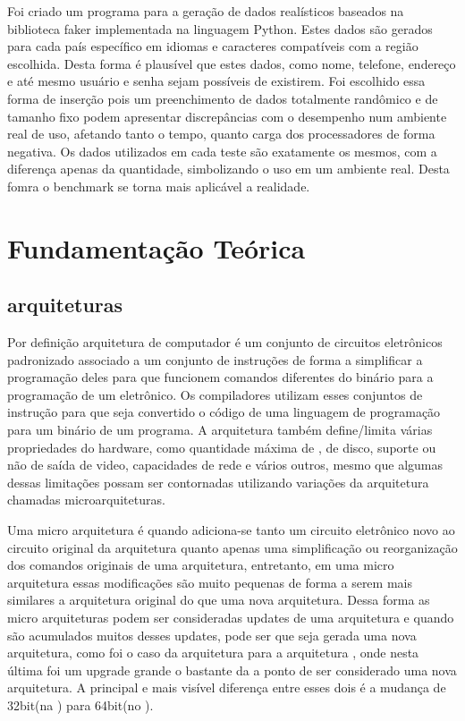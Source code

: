 \documentclass[
	12pt,				%
	openright,			%
	oneside,			%
	a4paper,			%
	english,			%
	french,				%
	spanish,			%
	brazil,				%
	]{abntex2}
\begin{document}
Foi criado um programa para a geração de dados realísticos baseados na biblioteca faker implementada na linguagem Python. Estes dados são gerados para cada país específico em idiomas e caracteres compatíveis com a região escolhida. Desta forma é plausível que estes dados, como nome, telefone, endereço e até mesmo usuário e senha sejam possíveis de existirem. Foi escolhido essa forma de inserção pois um preenchimento de dados totalmente randômico e de tamanho fixo podem apresentar discrepâncias com o desempenho num ambiente real de uso, afetando tanto o tempo, quanto carga dos processadores de forma negativa. Os dados utilizados em cada teste são exatamente os mesmos, com a diferença apenas da quantidade, simbolizando o uso em um ambiente real. Desta fomra o benchmark se torna mais aplicável a realidade.\newline

\chapter{Fundamentação Teórica}
\label{ch:fundamentacao teorica}

\section{arquiteturas}
\label{sec: arquiteturas}
Por definição arquitetura de computador é um conjunto de circuitos eletrônicos padronizado associado a um conjunto de instruções de forma a simplificar a programação deles para que funcionem comandos diferentes do binário para a programação de um eletrônico. Os compiladores utilizam esses conjuntos de instrução para que seja convertido o código de uma linguagem de programação para um binário de um programa. A arquitetura também define/limita várias propriedades do hardware, como quantidade máxima de , de disco, suporte ou não de saída de video, capacidades de rede e vários outros, mesmo que algumas dessas limitações possam ser contornadas utilizando variações da arquitetura chamadas microarquiteturas.\newline

Uma micro arquitetura é quando adiciona-se tanto um circuito eletrônico novo ao circuito original da arquitetura quanto apenas uma simplificação ou reorganização dos comandos originais de uma arquitetura, entretanto, em uma micro arquitetura essas modificações são muito pequenas de forma a serem mais similares a arquitetura original do que uma nova arquitetura. Dessa forma as micro arquiteturas podem ser consideradas updates de uma arquitetura e quando são acumulados muitos desses updates, pode ser que seja gerada uma nova arquitetura, como foi o caso da arquitetura  para a arquitetura , onde nesta última foi um upgrade grande o bastante da  a ponto de ser considerado uma nova arquitetura. A principal e mais visível diferença entre esses dois é a mudança de 32bit(na ) para 64bit(no ).\newline
\end{document}
